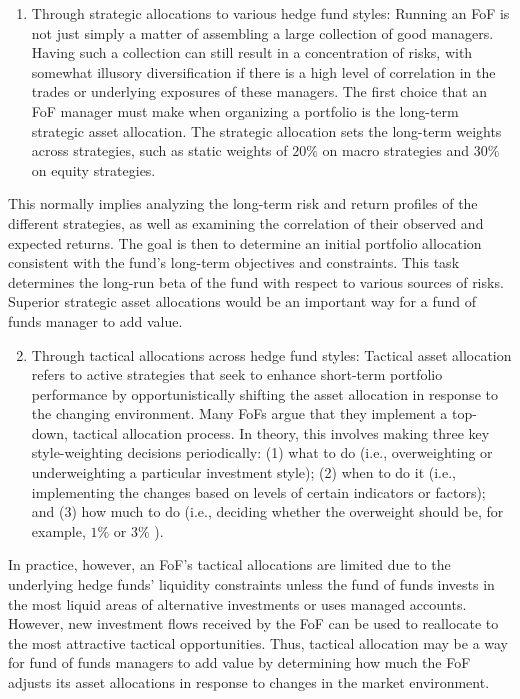 \documentclass[11pt]{article}
\begin{document}
\begin{enumerate}
  \item Through strategic allocations to various hedge fund styles: Running an FoF is not just simply a matter of assembling a large collection of good managers. Having such a collection can still result in a concentration of risks, with somewhat illusory diversification if there is a high level of correlation in the trades or underlying exposures of these managers. The first choice that an FoF manager must make when organizing a portfolio is the long-term strategic asset allocation. The strategic allocation sets the long-term weights across strategies, such as static weights of $20 \%$ on macro strategies and $30 \%$ on equity strategies.
\end{enumerate}

This normally implies analyzing the long-term risk and return profiles of the different strategies, as well as examining the correlation of their observed and expected returns. The goal is then to determine an initial portfolio allocation consistent with the fund's long-term objectives and constraints. This task determines the long-run beta of the fund with respect to various sources of risks. Superior strategic asset allocations would be an important way for a fund of funds manager to add value.

\begin{enumerate}
  \setcounter{enumi}{1}
  \item Through tactical allocations across hedge fund styles: Tactical asset allocation refers to active strategies that seek to enhance short-term portfolio performance by opportunistically shifting the asset allocation in response to the changing environment. Many FoFs argue that they implement a top-down, tactical allocation process. In theory, this involves making three key style-weighting decisions periodically: (1) what to do (i.e., overweighting or underweighting a particular investment style); (2) when to do it (i.e., implementing the changes based on levels of certain indicators or factors); and (3) how much to do (i.e., deciding whether the overweight should be, for example, $1 \%$ or $3 \%$ ).
\end{enumerate}

In practice, however, an FoF's tactical allocations are limited due to the underlying hedge funds' liquidity constraints unless the fund of funds invests in the most liquid areas of alternative investments or uses managed accounts. However, new investment flows received by the FoF can be used to reallocate to the most attractive tactical opportunities. Thus, tactical allocation may be a way for fund of funds managers to add value by determining how much the FoF adjusts its asset allocations in response to changes in the market environment.
\end{document}
